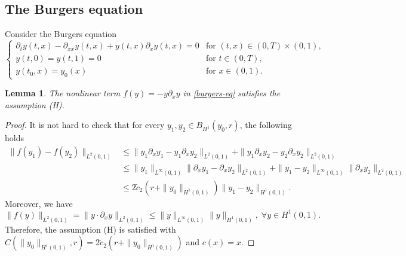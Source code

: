 \documentclass[review]{elsarticle}
\newtheorem{lemma}[theorem]{Lemma}
\numberwithin{equation}{section}
\begin{document}
\subsection{The Burgers equation}

Consider the Burgers equation 
\begin{equation}
    \label{burgers-eq}
\left\{\begin{array}{ll}
\partial_t y(t,x)-\partial_{xx}y(t,x)+y (t,x) \partial_x y(t,x)=0 & \text{for }(t,x)\in (0,T)\times (0,1),\\[2mm]
y( t,0)=y( t,1)=0& \text{for }t\in (0,T),\\[2mm]
y(t_0,x)=y_0(x)& \text{for }x\in (0,1).
\end{array}\right.
\end{equation}


\begin{lemma}
    \label{thm1.1-to-burs}
    The nonlinear term $f(y)=-y\partial_x y$ in \eqref{burgers-eq} satisfies the assumption (H). 
\end{lemma}
\begin{proof}
It is not hard to check that for every $y_1,y_2\in B_{{H^1}}(y_0,r)$, the following holds
    \begin{equation*}
             \label{bf}
             \begin{aligned}
                 \|f(y_1)-f(y_2)\|_{L^2(0,1)}   &\le \|y_1\partial_x y_1-y_1\partial_x y_2\|_{L^2(0,1)}+\|y_1\partial_x y_2-y_2\partial_x y_2\|_{L^2(0,1)}\\
                 &\le \|y_1\|_{L^{\infty}(0,1)}\|\partial_x y_1-\partial_x y_2\|_{L^2(0,1)}+\|y_1-y_2\|_{L^{\infty}(0,1)}\|\partial_x y_2\|_{L^2(0,1)}\\
                 &\le 2\tilde{c}_2(r+\|y_0\|_{H^1(0,1)})\|y_1-y_2\|_{H^1(0,1)}.
             \end{aligned}
         \end{equation*}
       Moreover, we have
       \begin{equation*}
             \label{bf1}
                \|f(y)\|_{L^2(0,1)}= \|y\cdot \partial_x y\|_{L^2(0,1)}\le \|y\|_{L^{\infty}(0,1)}\|y\|_{H^1(0,1)},\; \forall y\in H^1(0,1).
         \end{equation*}
        Therefore, the assumption (H) is satisfied with $C(\|y_0\|_{H^1(0,1)},r)=2\tilde{c}_2(r+\|y_0\|_{H^1(0,1)})$ and $c(x)=x$.
\end{proof}
\end{document}
